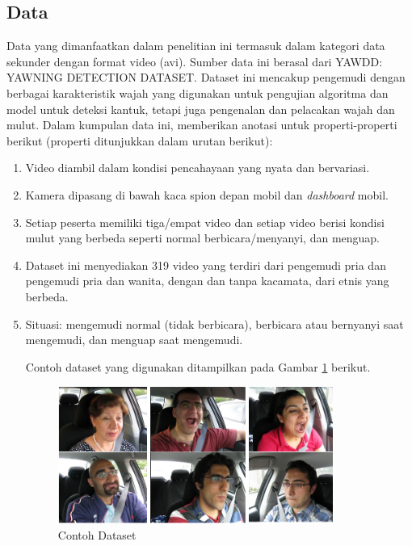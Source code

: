     
\subsection{Data}

    Data yang dimanfaatkan dalam penelitian ini termasuk dalam kategori data sekunder dengan format video (avi). Sumber data ini berasal dari YAWDD: YAWNING DETECTION DATASET. Dataset ini mencakup pengemudi dengan berbagai karakteristik wajah yang digunakan untuk pengujian algoritma dan model untuk deteksi kantuk, tetapi juga pengenalan dan pelacakan wajah dan 
    mulut. Dalam kumpulan data ini, memberikan anotasi untuk properti-properti berikut (properti ditunjukkan dalam urutan berikut):


    \begin{enumerate}

        \item Video diambil dalam kondisi pencahayaan yang nyata dan bervariasi.
        \item Kamera dipasang di bawah kaca spion depan mobil dan \textit{dashboard} mobil. 
        \item  Setiap peserta memiliki tiga/empat video dan setiap video berisi kondisi mulut yang berbeda seperti normal berbicara/menyanyi, dan menguap. 
        \item Dataset ini menyediakan 319 video yang terdiri dari pengemudi pria dan 
        pengemudi pria dan wanita, dengan dan tanpa kacamata, dari etnis yang berbeda.
        \item Situasi: mengemudi normal (tidak berbicara), berbicara atau bernyanyi saat mengemudi, dan menguap saat mengemudi.



    Contoh dataset yang digunakan ditampilkan pada Gambar \ref{Contoh Dataset} berikut.

    \begin{figure}[H]
        \centering
        \includegraphics[width=0.85\textwidth]{figures/bab3/image.png}
        \caption{Contoh Dataset}
        \label{Contoh Dataset}
    \end{figure}

        
    
    \end{enumerate}
    
